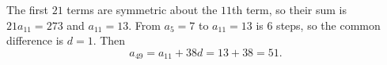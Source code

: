 The first $21$ terms are symmetric about the $11$th term, so their sum is $21a_{11}=273$ and $a_{11}=13$. From $a_5=7$ to $a_{11}=13$ is $6$ steps, so the common difference is $d=1$. Then
\[
a_{49}=a_{11}+38d=13+38=\boxed{51}.
\]
